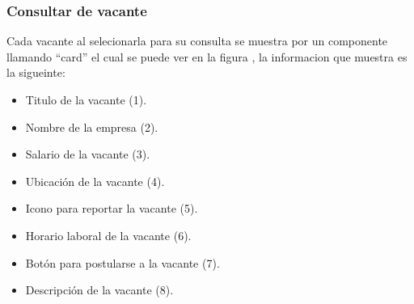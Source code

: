 \subsubsection{Consultar de vacante}
Cada vacante al selecionarla para su consulta se muestra por un componente llamando ``card'' el cual se puede ver en la figura , la informacion que 
muestra es la sigueinte: 
\begin{itemize}
   \item Titulo de la vacante (1).
   \item Nombre de la empresa (2).
   \item Salario de la vacante (3).
   \item Ubicación de la vacante (4).
   \item Icono para reportar la vacante (5).
   \item Horario laboral de la vacante (6).
   \item Botón para postularse a la vacante (7).
   \item Descripción de la vacante (8).
\end{itemize}





